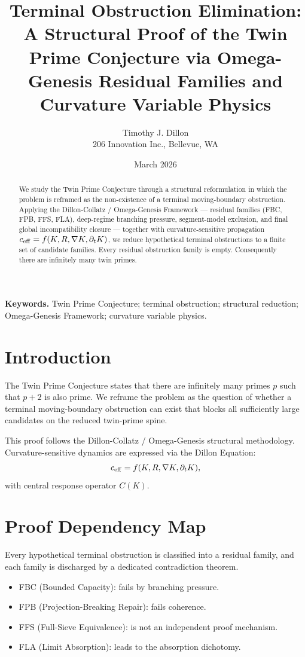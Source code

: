 \documentclass[11pt,a4paper]{article}
\title{Terminal Obstruction Elimination: A Structural Proof of the Twin Prime Conjecture via Omega-Genesis Residual Families and Curvature Variable Physics}
\author{Timothy J. Dillon \\ 206 Innovation Inc., Bellevue, WA}
\date{March 2026}
\begin{document}
\maketitle

\begin{abstract}
We study the Twin Prime Conjecture through a structural reformulation in which the problem is reframed as the non-existence of a terminal moving-boundary obstruction. Applying the Dillon-Collatz / Omega-Genesis Framework --- residual families (FBC, FPB, FFS, FLA), deep-regime branching pressure, segment-model exclusion, and final global incompatibility closure --- together with curvature-sensitive propagation \(c_{\rm eff} = f(K, R, \nabla K, \partial_t K)\), we reduce hypothetical terminal obstructions to a finite set of candidate families. Every residual obstruction family is empty. Consequently there are infinitely many twin primes.
\end{abstract}

\textbf{Keywords.} Twin Prime Conjecture; terminal obstruction; structural reduction; Omega-Genesis Framework; curvature variable physics.

\section{Introduction}
The Twin Prime Conjecture states that there are infinitely many primes \(p\) such that \(p+2\) is also prime. We reframe the problem as the question of whether a terminal moving-boundary obstruction can exist that blocks all sufficiently large candidates on the reduced twin-prime spine.

This proof follows the Dillon-Collatz / Omega-Genesis structural methodology. Curvature-sensitive dynamics are expressed via the Dillon Equation:
\[
c_{\rm eff} = f(K, R, \nabla K, \partial_t K),
\]
with central response operator \(C(K)\).

\section{Proof Dependency Map}
Every hypothetical terminal obstruction is classified into a residual family, and each family is discharged by a dedicated contradiction theorem.

\begin{itemize}
    \item FBC (Bounded Capacity): fails by branching pressure.
    \item FPB (Projection-Breaking Repair): fails coherence.
    \item FFS (Full-Sieve Equivalence): is not an independent proof mechanism.
    \item FLA (Limit Absorption): leads to the absorption dichotomy.
\end{itemize}
\end{document}
